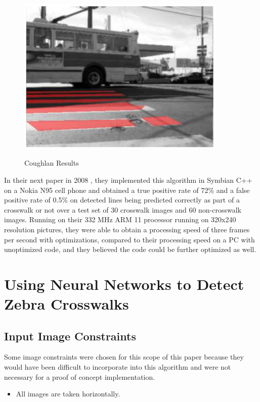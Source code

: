 \documentclass[12pt]{ucthesis}
\newcommand{\captionfonts}{\small\bf\ssp}
\begin{document}
\begin{figure}[t]
\begin{center}
\includegraphics[width=10cm]{CoughlanResult.png}
\captionfonts
\caption[Coughlan Results]{Coughlan Results \cite{Coughlan2006}}
\label{fig:CoughlanResults}
\end{center}
\end{figure}

In their next paper in 2008 \cite{ZebraPhone}, they implemented this algorithm in Symbian C++ on a Nokia  N95 cell phone and obtained a true positive rate of 72\% and a false positive rate of 0.5\% on detected lines being predicted correctly as part of a crosswalk or not over a test set of 30 crosswalk images and 60 non-crosswalk images. Running on their 332 MHz ARM 11 processor running on 320x240 resolution pictures, they were able to obtain a processing speed of three frames per second with optimizations, compared to their processing speed on a PC with unoptimized code, and they believed the code could be further optimized as well. 

\chapter{Using Neural Networks to Detect Zebra Crosswalks}

\section{Input Image Constraints}
\label{Input Image Constraints}

Some image constraints were chosen for this scope of this paper because they would have been difficult to incorporate into this algorithm and were not necessary for a proof of concept implementation.

\begin{itemize}
\item All images are taken horizontally.
\end{itemize}
\end{document}
